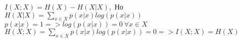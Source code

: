 \documentclass[../main.tex]{subfiles}
\begin{document}
\noindent $I(X;X) = H(X) - H(X|X),$ Но $H(X|X) = \sum\limits_{x \in X} p(x|x)log(p(x|x))$ \\ 
$p(x|x) = 1 => log(p(x|x)) = 0 \ \forall x \in X$ \\ 
$H(X;X) = \sum\limits_{x \in X} p(x|x)log(p(x|x)) = 0 => I(X;X) = H(X)$
\end{document}
